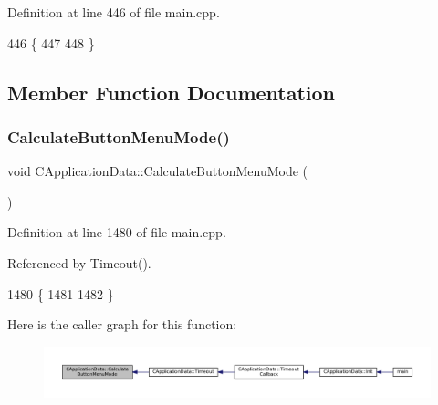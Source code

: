Definition at line 446 of file main.\+cpp.


\begin{DoxyCode}
446                                    \{
447     
448 \}
\end{DoxyCode}


\subsection{Member Function Documentation}
\hypertarget{classCApplicationData_a5654dc28e14fa5bbc9ceb630d5259f91}{}\label{classCApplicationData_a5654dc28e14fa5bbc9ceb630d5259f91} 
\subsubsection{\texorpdfstring{Calculate\+Button\+Menu\+Mode()}{CalculateButtonMenuMode()}}
{\footnotesize\ttfamily void C\+Application\+Data\+::\+Calculate\+Button\+Menu\+Mode (\begin{DoxyParamCaption}{ }\end{DoxyParamCaption})\hspace{0.3cm}{\ttfamily [protected]}}



Definition at line 1480 of file main.\+cpp.



Referenced by Timeout().


\begin{DoxyCode}
1480                                               \{
1481 
1482 \}
\end{DoxyCode}
Here is the caller graph for this function\+:\nopagebreak
\begin{figure}[H]
\begin{center}
\leavevmode
\includegraphics[width=350pt]{classCApplicationData_a5654dc28e14fa5bbc9ceb630d5259f91_icgraph}
\end{center}
\end{figure}
\hypertarget{classCApplicationData_a9fa1176cd629742424f29ab20c212142}{}\label{classCApplicationData_a9fa1176cd629742424f29ab20c212142} 
